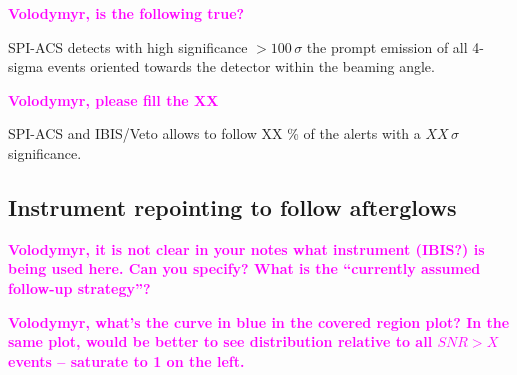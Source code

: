 \documentclass[a0,portrait]{a0poster}
\newcommand{\ECM}[1] {\textbf{\textcolor{magenta}{#1}}}
\begin{document}
\begin{multicols}{2}
\ECM{Volodymyr, is the following true?}

SPI-ACS detects with high significance $> 100 \, \sigma$ the prompt emission of
all 4-sigma events oriented towards the detector within the beaming angle.

\ECM{Volodymyr, please fill the XX}

SPI-ACS and IBIS/Veto allows to follow XX \% of the alerts with a 
$XX \, \sigma$ significance.

\subsection*{Instrument repointing to follow afterglows}

\ECM{Volodymyr, it is not clear in your notes what instrument (IBIS?) is being
  used here. Can you specify? What is the ``currently assumed follow-up
  strategy''?}

\ECM{Volodymyr, what's the curve in blue in the covered region plot? In the same
  plot, would be better to see distribution relative to all $SNR > X$ events --
  saturate to 1 on the left.}


\end{multicols}
\end{document}
